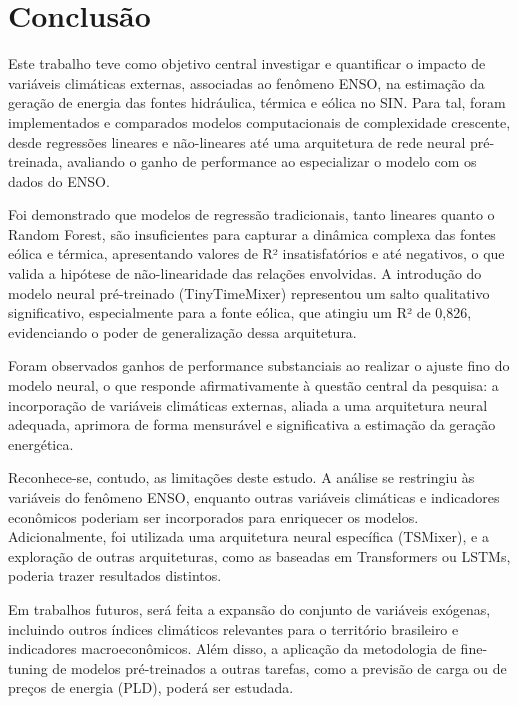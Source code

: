\chapter{Conclusão}
Este trabalho teve como objetivo central investigar e quantificar o impacto de variáveis climáticas externas, associadas ao 
fenômeno ENSO, na estimação da geração de energia das fontes hidráulica, térmica e eólica no SIN. 
Para tal, foram implementados e comparados modelos computacionais de complexidade crescente, desde regressões lineares e 
não-lineares até uma arquitetura de rede neural pré-treinada, avaliando o ganho de performance ao especializar o modelo com 
os dados do ENSO.

Foi demonstrado que modelos de regressão tradicionais, tanto lineares quanto o Random Forest, são insuficientes para capturar 
a dinâmica complexa das fontes eólica e térmica, apresentando valores de R² insatisfatórios e até negativos, o que valida 
a hipótese de não-linearidade das relações envolvidas. A introdução do modelo neural pré-treinado (TinyTimeMixer) 
representou um salto qualitativo significativo, especialmente para a fonte eólica, que atingiu um R² de 0,826, evidenciando 
o poder de generalização dessa arquitetura.

Foram observados ganhos de performance substanciais ao realizar o ajuste fino do modelo neural, o que responde afirmativamente 
à questão central da pesquisa: a incorporação de variáveis climáticas externas, aliada a uma arquitetura neural adequada, 
aprimora de forma mensurável e significativa a estimação da geração energética.

Reconhece-se, contudo, as limitações deste estudo. A análise se restringiu às variáveis do fenômeno ENSO, enquanto outras 
variáveis climáticas e indicadores econômicos poderiam ser incorporados para enriquecer os modelos. Adicionalmente, foi 
utilizada uma arquitetura neural específica (TSMixer), e a exploração de outras arquiteturas, como as baseadas em Transformers 
ou LSTMs, poderia trazer resultados distintos.

Em trabalhos futuros, será feita a expansão do conjunto de variáveis exógenas, incluindo outros índices 
climáticos relevantes para o território brasileiro e indicadores macroeconômicos. Além disso, a aplicação da metodologia de 
fine-tuning de modelos pré-treinados a outras tarefas, como a previsão de carga ou de preços de energia (PLD), poderá ser estudada.